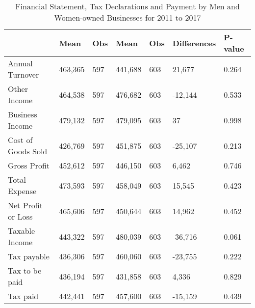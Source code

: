 \begin{table}[htbp]
\caption{\label{tab:table4} Financial Statement, Tax Declarations and Payment by Men and Women-owned Businesses for 2011 to 2017}\centering\medskip
\begin{tabular}{lllllll} \hline \hline
 & Mean  & Obs  & Mean  & Obs  & Differences  & P-value  \\  \hline 
Annual Turnover &      463,365 &          597 &      441,688 &          603 &       21,677 &     0.264 \\  
Other Income &      464,538 &          597 &      476,682 &          603 &      -12,144 &     0.533 \\  
Business Income &      479,132 &          597 &      479,095 &          603 &           37 &     0.998 \\  
Cost of Goods Sold &      426,769 &          597 &      451,875 &          603 &      -25,107 &     0.213 \\  
Gross Profit &      452,612 &          597 &      446,150 &          603 &        6,462 &     0.746 \\  
Total Expense &      473,593 &          597 &      458,049 &          603 &       15,545 &     0.423 \\  
Net Profit or Loss &      465,606 &          597 &      450,644 &          603 &       14,962 &     0.452 \\  
Taxable Income &      443,322 &          597 &      480,039 &          603 &      -36,716 &     0.061 \\  
Tax payable &      436,306 &          597 &      460,060 &          603 &      -23,755 &     0.222 \\  
Tax to be paid &      436,194 &          597 &      431,858 &          603 &        4,336 &     0.829 \\  
Tax paid &      442,441 &          597 &      457,600 &          603 &      -15,159 &     0.439 \\  
\hline \hline \end{tabular}
\end{table}
